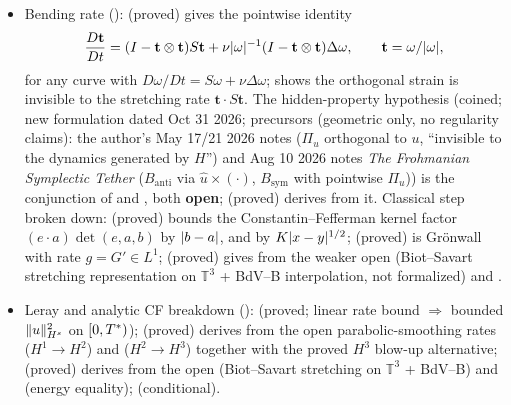 \documentclass[11pt]{article}
\begin{document}
\begin{itemize}
\item Bending rate ():  (proved) gives the pointwise identity
\begin{equation}
\frac{D\mathbf t}{Dt}=(I-\mathbf t\otimes\mathbf t)S\mathbf t+\nu\lvert\omega\rvert^{-1}(I-\mathbf t\otimes\mathbf t)\Delta\omega,\qquad \mathbf t=\omega/\lvert\omega\rvert,
\end{equation}
for any curve with $D\omega/Dt=S\omega+\nu\Delta\omega$;  shows the orthogonal strain is invisible to the stretching rate $\mathbf t\cdot S\mathbf t$. The hidden-property hypothesis  (coined; new formulation dated Oct 31 2026; precursors (geometric only, no regularity claims): the author's May 17/21 2026 notes ($\Pi_u$ orthogonal to $u$, ``invisible to the dynamics generated by $H$'') and Aug 10 2026 notes \emph{The Frohmanian Symplectic Tether} ($B_{\mathrm{anti}}$ via $\hat u\times(\cdot)$, $B_{\mathrm{sym}}$ with pointwise $\Pi_u$)) is the conjunction of  and , both \textbf{open};  (proved) derives  from it. Classical step broken down:  (proved) bounds the Constantin--Fefferman kernel factor $(e\cdot a)\det(e,a,b)$ by $\lvert b-a\rvert$, and  by $K\lvert x-y\rvert^{1/2}$;  (proved) is Gr\"onwall with rate $g=G'\in L^1$;  (proved) gives  from the weaker open  (Biot--Savart stretching representation on $\mathbb T^3$ + BdV--B interpolation, not formalized) and .
\item Leray and analytic CF breakdown ():  (proved; linear rate bound $\Rightarrow$ bounded $\lVert u\rVert_{H^s}^2$ on $[0,T^{*})$);  (proved) derives  from the open parabolic-smoothing rates  ($H^1\to H^2$) and  ($H^2\to H^3$) together with the proved $H^3$ blow-up alternative;  (proved) derives  from the open  (Biot--Savart stretching on $\mathbb{T}^3$ + BdV--B) and  (energy equality);  (conditional).

\end{itemize}
\end{document}
